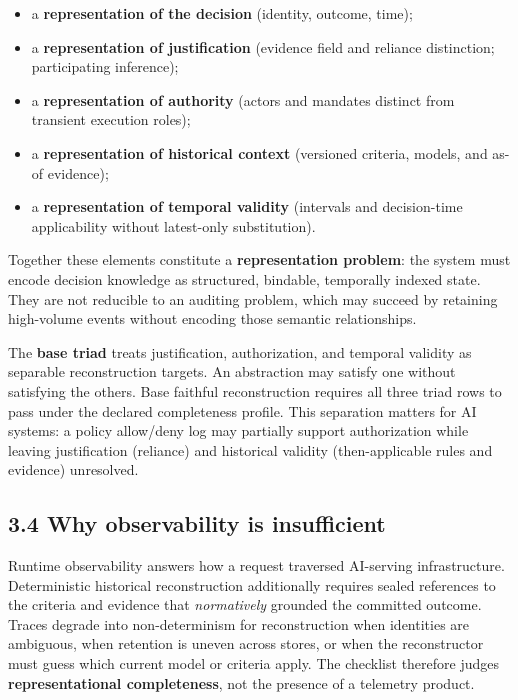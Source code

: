 \documentclass[11pt,a4paper]{article}
\begin{document}
\begin{itemize}
\item a \textbf{representation of the decision} (identity, outcome, time);
\item a \textbf{representation of justification} (evidence field and reliance distinction; participating inference);
\item a \textbf{representation of authority} (actors and mandates distinct from transient execution roles);
\item a \textbf{representation of historical context} (versioned criteria, models, and as-of evidence);
\item a \textbf{representation of temporal validity} (intervals and decision-time applicability without latest-only substitution).
\end{itemize}

Together these elements constitute a \textbf{representation problem}: the system must encode decision knowledge as structured, bindable, temporally indexed state. They are not reducible to an auditing problem, which may succeed by retaining high-volume events without encoding those semantic relationships.


The \textbf{base triad} treats justification, authorization, and temporal validity as separable reconstruction targets. An abstraction may satisfy one without satisfying the others. Base faithful reconstruction requires all three triad rows to pass under the declared completeness profile. This separation matters for AI systems: a policy allow/deny log may partially support authorization while leaving justification (reliance) and historical validity (then-applicable rules and evidence) unresolved.


\subsection{3.4 Why observability is insufficient}

Runtime observability answers how a request traversed AI-serving infrastructure. Deterministic historical reconstruction additionally requires sealed references to the criteria and evidence that \emph{normatively} grounded the committed outcome. Traces degrade into non-determinism for reconstruction when identities are ambiguous, when retention is uneven across stores, or when the reconstructor must guess which current model or criteria apply. The checklist therefore judges \textbf{representational completeness}, not the presence of a telemetry product.
\end{document}
